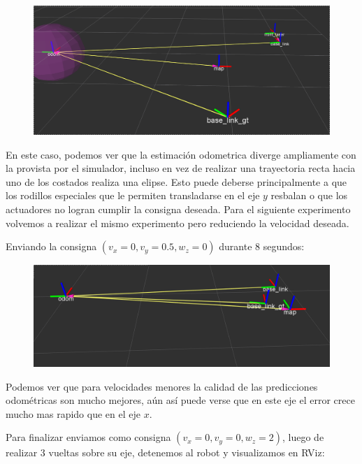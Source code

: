 \begin{figure}[!htb]
\includegraphics[width=\linewidth]{pruebasOdom/8segIzquierda2.png}
\end{figure}

En este caso, podemos ver que la estimación odometrica diverge ampliamente con la provista por el simulador, incluso en vez de realizar una trayectoria recta hacia uno de los costados realiza una elipse. Esto puede deberse principalmente a que los rodillos especiales que le permiten transladarse en el eje $y$ resbalan o que los actuadores no logran cumplir la consigna deseada. Para el siguiente experimento volvemos a realizar el mismo experimento pero reduciendo la velocidad deseada.

Enviando la consigna $(v_x = 0, v_y=0.5,w_z=0)$ durante 8 segundos: 

\begin{figure}[!htb]
\includegraphics[width=\linewidth]{pruebasOdom/8segIzquierda05.png}
\end{figure}

Podemos ver que para velocidades menores la calidad de las predicciones odométricas son mucho mejores, aún así puede verse que en este eje el error crece mucho mas rapido que en el eje $x$.

\pagebreak

Para finalizar enviamos como consigna $(v_x = 0, v_y=0,w_z=2)$, luego de realizar 3 vueltas sobre su eje, detenemos al robot y visualizamos en RViz:

